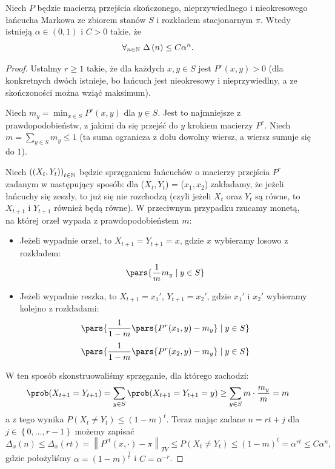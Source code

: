 \begin{theorem}
	\label{geometric-convergence}
	Niech \(P\) będzie macierzą przejścia skończonego, nieprzywiedlnego i nieokresowego łańcucha Markowa ze zbiorem stanów \(S\) i rozkładem stacjonarnym \(\pi\). Wtedy istnieją \(\alpha \in (0,1)\) i \(C > 0\) takie, że
	\[ \forall_{n \in \mathbb{N}} \ \Delta\left( n  \right) \le C \alpha^{n}.  \]
\end{theorem}
\begin{proof}
	Ustalmy \(r\ge 1\) takie, że dla każdych \(x,y \in S\) jest \(P^{r}\left( x,y \right) > 0\) (dla konkretnych dwóch istnieje, bo łańcuch jest nieokresowy i nieprzywiedlny, a ze skończoności można wziąć maksimum).

	Niech \(m_y = \min_{x \in S} P^{r}\left( x,y \right)\) dla \(y \in S\). Jest to najmniejsze z prawdopodobieństw, z jakimi da się przejść do \(y\) krokiem macierzy \(P^{r}\). Niech \(m = \sum_{y \in S}^{} m_y \le 1\) (ta suma ogranicza z dołu dowolny wiersz, a wiersz sumuje się do \(1\)).

	Niech \(\left( \left( X_t,Y_t \right)  \right) _{t \in  \mathbb{N}}\) będzie sprzęganiem łańcuchów o macierzy przejścia \(P^{r}\) zadanym w następujący sposób: dla (\(X_t, Y_t \)) = (\(x_1, x_2\)) zakładamy, że jeżeli łańcuchy się zeszły, to już się nie rozchodzą (czyli jeżeli \(X_t\) oraz \(Y_t\) są równe, to \(X_{t+1}\) i \(Y_{t+1}\) również będą równe).
	W przeciwnym przypadku rzucamy monetą, na której orzeł wypada z prawdopodobieństem \(m\):
	\begin{itemize}
		\item Jeżeli wypadnie orzeł, to \(X_{t+1} = Y_{t+1} = x\), gdzie \(x\) wybieramy losowo z rozkładem:
		      \[
			      \pars{\frac{1}{m} m_y \mid y \in S}
		      \]
		\item Jeżeli wypadnie reszka, to \(X_{t+1} = x_1'\), \(Y_{t+1} = x_2'\), gdzie \(x_1'\) i \(x_2'\) wybieramy kolejno z rozkładami:
		      \[
			      \pars{\frac{1}{1-m} \pars{P^r(x_1, y) - m_y} \mid y \in S}
		      \]
		      \[
			      \pars{\frac{1}{1-m} \pars{P^r(x_2, y) - m_y} \mid y \in S}
		      \]
	\end{itemize}

	W ten sposób skonstruowaliśmy sprzęganie, dla którego zachodzi:
	\[
		\prob(X_{t+1} = Y_{t+1}) = \sum_{y \in S} \prob(X_{t+1} = Y_{t+1} = y) \geq \sum_{y \in S} m \cdot \frac{m_y}{m} = m
	\]
	a z tego wynika \(P\left( X_t \neq Y_t \right) \le \left( 1-m \right) ^{t}.\) Teraz mając zadane \(n = rt + j\) dla \(j \in \left\{ 0,\ldots,r-1 \right\} \) możemy zapisać
	\[ \Delta_x\left( n  \right) \le \Delta_x\left( rt \right) = \left\|P^{rt}\left( x,\cdot  \right) -\pi\right\|_{TV} \le P\left( X_t \neq Y_t \right) \le \left( 1-m \right) ^{t} = \alpha ^{rt} \le C\alpha ^{n}, \]
	gdzie położyliśmy \(\alpha = \left( 1-m \right) ^{\frac{1}{r}}\) i \(C = \alpha ^{-r}\).
\end{proof}
